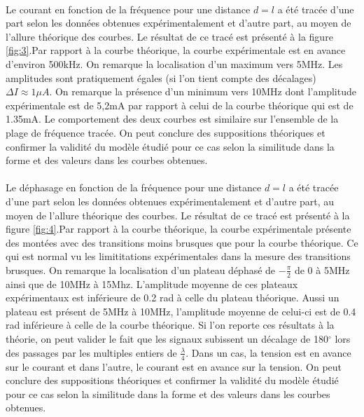 \paragraph{}Le courant en fonction de la fréquence pour une distance $d = l$ a été tracée d'une part selon les données obtenues expérimentalement et d'autre part, au moyen de l'allure théorique des courbes. Le résultat de ce tracé est présenté à la figure \ref{fig:3}.Par rapport à la courbe théorique, la courbe expérimentale est en avance d'environ 500kHz. On remarque la localisation d'un maximum vers 5MHz. Les amplitudes sont pratiquement égales (si l'on tient compte des décalages) $\Delta I \approx 1\mu A$. On remarque la présence d'un minimum vers 10MHz dont l'amplitude expérimentale est de 5,2mA par rapport à  celui de la courbe théorique qui est de 1.35mA. Le comportement des deux courbes est similaire sur l'ensemble de la plage de fréquence tracée. On peut conclure des suppositions théoriques et confirmer la validité du modèle étudié pour ce cas selon la similitude dans la forme et des valeurs dans les courbes obtenues.

\paragraph{}Le déphasage en fonction de la fréquence pour une distance $d = l$ a été tracée d'une part selon les données obtenues expérimentalement et d'autre part, au moyen de l'allure théorique des courbes. Le résultat de ce tracé est présenté à la figure \ref{fig:4}.Par rapport à la courbe théorique, la courbe expérimentale présente des montées avec des transitions moins brusques que pour la courbe théorique. Ce qui est normal vu les limititations expérimentales dans la mesure des transitions brusques. On remarque la localisation d'un plateau déphasé de $-\frac{\pi}{2}$ de 0 à 5MHz ainsi que de 10MHz à 15Mhz. L'amplitude moyenne de ces plateaux expérimentaux est inférieure de 0.2 rad à celle du plateau théorique. Aussi un plateau est présent de 5MHz à 10MHz, l'amplitude moyenne de celui-ci est de 0.4 rad inférieure à celle de la courbe théorique. Si l'on reporte ces résultats à la théorie, on peut valider le fait que les signaux subissent un décalage de 180$^\circ$ lors des passages par les multiples entiers de $\frac{\lambda}{4}$. Dans un cas, la tension est en avance sur le courant et dans l'autre, le courant est en avance sur la tension. On peut conclure des suppositions théoriques et confirmer la validité du modèle étudié pour ce cas selon la similitude dans la forme et des valeurs dans les courbes obtenues.

